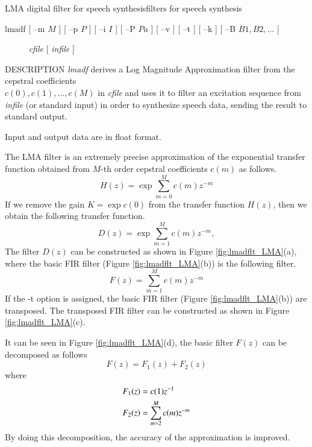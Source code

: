 \hypertarget{lmadf}{}
%
{LMA digital filter for speech synthesis}{filters for speech synthesis}

\begin{synopsis}
\item [lmadf] [ --m $M$ ] [ --p $P$ ] [ --i $I$ ] [ --P $Pa$ ] [ --v ]
  [ --t ] [ --k ] [ --B $B1,B2,...$ ] 
\item [\ ~~~~]{\em cfile} [ {\em infile} ]
\end{synopsis}

\begin{qsection}{DESCRIPTION}
{\em lmadf} derives a Log Magnitude Approximation filter 
from the cepstral coefficients \\
$c(0),c(1),\ldots,c(M)$ in {\em cfile} and uses it to filter an excitation sequence 
from {\em infile} (or standard input) in order to synthesize speech data, 
sending the result to standard output.

Input and output data are in float format.

The LMA filter is an extremely precise approximation of the
exponential transfer function obtained from $M$-th order cepstral
coefficients $c(m)$ as follows.
\begin{displaymath}
H(z) = \exp \sum_{m=0}^{M} c(m) z^{-m}
\end{displaymath}
If we remove the gain $K = \exp c(0)$ from the transfer function
$H(z)$, then we obtain the following transfer function.
\begin{displaymath}
D(z) = \exp \sum_{m=1}^{M} c(m) z^{-m},
\end{displaymath}
The filter $D(z)$ can be constructed as shown in Figure
\ref{fig:lmadflt_LMA}(a), where the basic
FIR filter (Figure \ref{fig:lmadflt_LMA}(b)) is
the following filter.
\begin{displaymath}
F(z) = \sum_{m=1}^{M} c(m) z^{-m}
\end{displaymath}
If the -t option is assigned, the basic FIR filter (Figure
\ref{fig:lmadflt_LMA}(b)) are transposed. The transposed FIR filter
can be constructed as shown in Figure \ref{fig:lmadflt_LMA}(c).

It can be seen in Figure \ref{fig:lmadflt_LMA}(d),
the basic filter $F(z)$ can be decomposed as follows
\begin{displaymath}
F(z) = F_1(z) + F_2(z)
\end{displaymath}
where 
\begin{align}
F_1(z) &= c(1) z^{-1} \notag \\
F_2(z) &= \sum_{m=2}^{M} c(m) z^{-m} \notag
\end{align}
By doing this decomposition, the accuracy of the approximation
is improved.


\end{qsection}
